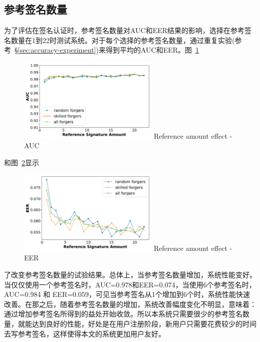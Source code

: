 \subsection{参考签名数量}
为了评估在签名认证时，参考签名数量对AUC和EER结果的影响，选择在参考签名数量在1到22时测试系统。对于每个选择的参考签名数量，通过重复实验(参考~\S\ref{sec:accuracy-experiment})来得到平均的AUC和EER。图~\ref{fig:rcount-auc-lines}
\begin{figure}[!htp]
  \centering
  \includegraphics[width=0.6\textwidth]{figure/rcount-auc-lines.pdf}
      {Reference amount effect - AUC}
  \label{fig:rcount-auc-lines}
\end{figure}
和图~\ref{fig:rcount-eer-lines}显示
\begin{figure}[!htp]
  \centering
  \includegraphics[width=0.6\textwidth]{figure/rcount-eer-lines.pdf}
      {Reference amount effect - EER}
  \label{fig:rcount-eer-lines}
\end{figure}
了改变参考签名数量的试验结果。总体上，当参考签名数量增加，系统性能变好。当仅仅使用一个参考签名时，AUC=0.978和EER=0.074，当使用6个参考签名时，AUC=0.984 和 EER=0.059，可见当参考签名从1个增加到6个时，系统性能快速改善。在那之后，随着参考签名数量的增加，系统改善幅度变化不明显，意味着：通过增加参考签名所得到的益处开始收敛。所以本系统只需要很少的参考签名数量，就能达到良好的性能，好处是在用户注册阶段，新用户只需要花费较少的时间去写参考签名，这样使得本文的系统更加用户友好。


